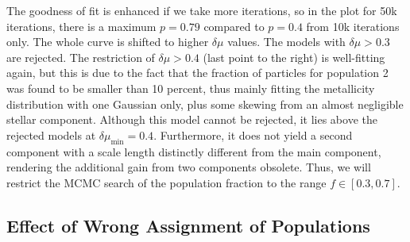 The goodness of fit is enhanced if we take more iterations, so in the
plot for 50k iterations, there is a maximum $p=0.79$ compared to
$p=0.4$ from 10k iterations only. The whole curve is shifted to higher
$\delta \mu$ values. The models with $\delta \mu>0.3$ are
rejected. The restriction of $\delta \mu>0.4$ (last point to the
right) is well-fitting again, but this is due to the fact that the
fraction of particles for population 2 was found to be smaller than 10
percent, thus mainly fitting the metallicity distribution with one
Gaussian only, plus some skewing from an almost negligible stellar
component. Although this model cannot be rejected, it lies above the
rejected models at $\delta\mu_{\min}=0.4$. Furthermore, it does not
yield a second component with a scale length distinctly different from
the main component, rendering the additional gain from two components
obsolete. Thus, we will restrict the MCMC search of the population
fraction to the range $f\in[0.3,0.7]$.






\subsection{Effect of Wrong Assignment of Populations}
